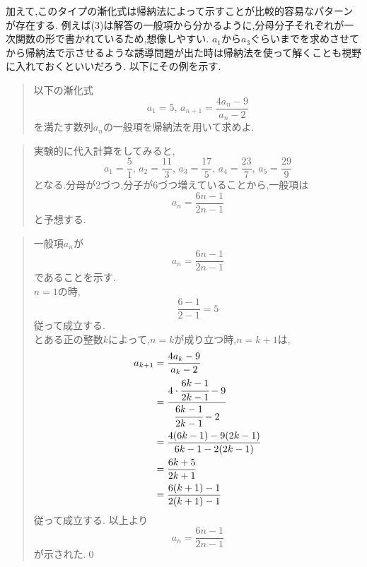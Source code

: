   加えて,このタイプの漸化式は帰納法によって示すことが比較的容易なパターンが存在する.
  例えば(3)は解答の一般項から分かるように,分母分子それぞれが一次関数の形で書かれているため,想像しやすい.
  $a_1$から$a_3$ぐらいまでを求めさせてから帰納法で示させるような誘導問題が出た時は帰納法を使って解くことも視野に入れておくといいだろう.
  以下にその例を示す.\\
    \noindent{}
    \begin{quote}
      以下の漸化式
      \[
        a_1=5,\, a_{n+1}=\dfrac{4a_{n}-9}{a_{n}-2}
      \]
      を満たす数列$a_n$の一般項を帰納法を用いて求めよ.
    \end{quote}
    \begin{quote}
      実験的に代入計算をしてみると,
      \[
        a_1=\frac{5}{1},\,a_2=\frac{11}{3},\,a_3=\frac{17}{5},\,a_4=\frac{23}{7},\,a_5=\frac{29}{9}
      \]
      となる.分母が2づつ,分子が6づつ増えていることから,一般項は
      \[
        a_n=\frac{6n-1}{2n-1}
      \]
      と予想する.
    \end{quote}
    \begin{quote}
      一般項$a_n$が
      \[
        a_n=\frac{6n-1}{2n-1}
      \]
      であることを示す.\\
      $n=1$の時,
      \[
        \frac{6-1}{2-1}=5
      \]
      従って成立する.\\
      とある正の整数$k$によって,$n=k$が成り立つ時,$n=k+1$は,
      \begin{align*}
        a_{k+1}&=\frac{4a_{k}-9}{a_{k}-2}\\
        &=\cfrac{4\cdot \cfrac{6k-1}{2k-1}-9}{\cfrac{6k-1}{2k-1}-2}\\
        &=\frac{4(6k-1)-9(2k-1)}{6k-1-2(2k-1)}\\
        &=\frac{6k+5}{2k+1}\\
        &=\frac{6(k+1)-1}{2(k+1)-1}
      \end{align*}
      従って成立する.
      以上より
      \[
        a_n=\frac{6n-1}{2n-1}
      \]
      が示された.\qed

  \end{quote}

